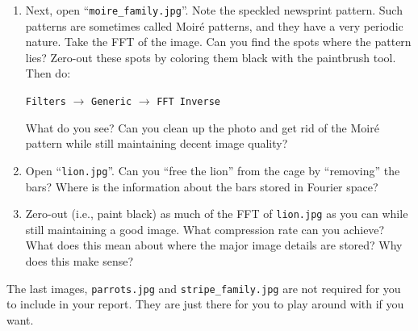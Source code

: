 \documentclass[11pt]{amsart}
\theoremstyle{plain}
\theoremstyle{definition}
\theoremstyle{remark}
\numberwithin{equation}{section} %
\numberwithin{figure}{section}   %
\begin{document}
\begin{itemize}
\begin{enumerate}
 \item Next, open ``\texttt{moire\_family.jpg}''. Note the speckled newsprint pattern.  Such patterns are sometimes called Moir\'e patterns, and they have a very periodic nature.  Take the FFT of the image.  Can you find the spots where the pattern lies?  Zero-out these spots by coloring them black with the paintbrush tool.  Then do:
 
\begin{center}
 \texttt{Filters} $\rightarrow$ \texttt{Generic} $\rightarrow$ \texttt{FFT Inverse}\end{center}
 What do you see?  Can you clean up the photo and get rid of the Moir\'e pattern while still maintaining decent image quality?  
 
 \item Open ``\texttt{lion.jpg}''.  Can you ``free the lion'' from the cage by ``removing'' the bars?  Where is the information about the bars stored in Fourier space?  
 
  \item Zero-out (i.e., paint black) as much of the FFT of \texttt{lion.jpg} as you can while still maintaining a good image.  What compression rate can you achieve?  What does this mean about where the major image details are stored?  Why does this make sense?
 
\end{enumerate}

\end{itemize}

The last images, \texttt{parrots.jpg} and \texttt{stripe\_family.jpg} are not required for you to include in your report.  They are just there for you to play around with if you want.
 
  

\end{document}
